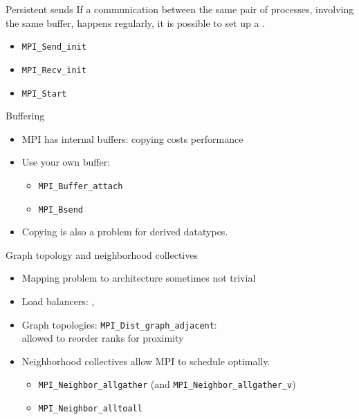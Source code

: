 \begin{numberedframe}{Persistent sends}
  If a communication between the same pair of processes, involving the
  same buffer, happens regularly, it is possible to set up a
  .

  \begin{itemize}
  \item \lstinline{MPI_Send_init}
  \item \lstinline{MPI_Recv_init}
  \item \lstinline{MPI_Start}
  \end{itemize}

\end{numberedframe}

\begin{numberedframe}{Buffering}

  \begin{itemize}
  \item MPI has internal buffers: copying costs performance
  \item Use your own buffer:
    \begin{itemize}
    \item \lstinline{MPI_Buffer_attach}
    \item \lstinline{MPI_Bsend}
    \end{itemize}
  \item Copying is also a problem for derived datatypes.
  \end{itemize}
\end{numberedframe}

\begin{numberedframe}{Graph topology and neighborhood collectives}
  \begin{itemize}
  \item Mapping problem to architecture sometimes not trivial
  \item Load balancers: , 
  \item Graph topologies: \lstinline{MPI_Dist_graph_adjacent}:\\
    allowed to reorder ranks for proximity
  \item Neighborhood collectives allow MPI to schedule optimally.
    \begin{itemize}
    \item \lstinline{MPI_Neighbor_allgather} (and \lstinline{MPI_Neighbor_allgather_v})
    \item \lstinline{MPI_Neighbor_alltoall}
    \end{itemize}
  \end{itemize}
\end{numberedframe}

